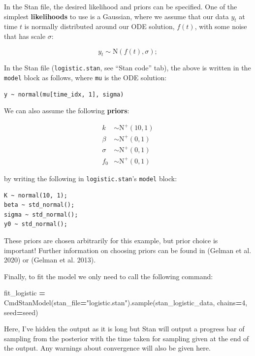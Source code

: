 \documentclass[
  12pt,
]{article}
\newenvironment{Shaded}{\begin{snugshade}}{\end{snugshade}}
\newcommand{\DecValTok}[1]{\textcolor[rgb]{0.00,0.00,0.81}{#1}}
\newcommand{\NormalTok}[1]{#1}
\newcommand{\OperatorTok}[1]{\textcolor[rgb]{0.81,0.36,0.00}{\textbf{#1}}}
\newcommand{\StringTok}[1]{\textcolor[rgb]{0.31,0.60,0.02}{#1}}
\begin{document}
In the Stan file, the desired likelihood and priors can be specified.
One of the simplest \textbf{likelihoods} to use is a Gaussian, where we
assume that our data \(y_t\) at time \(t\) is normally distributed
around our ODE solution, \(f(t)\), with some noise that has scale
\(\sigma\):

\[
y_t \sim \text{N}(f(t), \sigma);
\]

In the Stan file (\texttt{logistic.stan}, see ``Stan code'' tab), the
above is written in the \texttt{model} block as follows, where
\texttt{mu} is the ODE solution:

\begin{verbatim}
y ~ normal(mu[time_idx, 1], sigma)
\end{verbatim}

We can also assume the following \textbf{priors}:

\begin{align*}
    k &\sim \text{N}^+(10, 1) \\
    \beta &\sim \text{N}^+(0, 1) \\
    \sigma &\sim \text{N}^+(0, 1) \\
    f_0 &\sim \text{N}^+(0, 1)
\end{align*}

by writing the following in \texttt{logistic.stan}'s \texttt{model}
block:

\begin{verbatim}
K ~ normal(10, 1);
beta ~ std_normal();
sigma ~ std_normal();
y0 ~ std_normal();
\end{verbatim}

These priors are chosen arbitrarily for this example, but prior choice
is important! Further information on choosing priors can be found in
(Gelman et al. 2020) or (Gelman et al. 2013).

Finally, to fit the model we only need to call the following command:

\begin{Shaded}
\begin{Highlighting}[]
\NormalTok{fit\_logistic }\OperatorTok{=}\NormalTok{ CmdStanModel(stan\_file}\OperatorTok{=}\StringTok{"logistic.stan"}\NormalTok{).sample(stan\_logistic\_data, chains}\OperatorTok{=}\DecValTok{4}\NormalTok{, seed}\OperatorTok{=}\NormalTok{seed)}
\end{Highlighting}
\end{Shaded}

Here, I've hidden the output as it is long but Stan will output a
progress bar of sampling from the posterior with the time taken for
sampling given at the end of the output. Any warnings about convergence
will also be given here.
\end{document}
